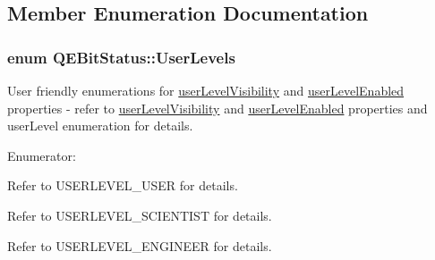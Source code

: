 \subsection{Member Enumeration Documentation}
\hypertarget{classQEBitStatus_a3b7b2b21622eff585577c6ab1b90b5ed}{
\subsubsection[{UserLevels}]{\setlength{\rightskip}{0pt plus 5cm}enum {\bf QEBitStatus::UserLevels}}}
\label{classQEBitStatus_a3b7b2b21622eff585577c6ab1b90b5ed}
User friendly enumerations for \hyperlink{classQEBitStatus_af9179749c38691f33cdcf1f8de7d3e3d}{userLevelVisibility} and \hyperlink{classQEBitStatus_aaf35e62560528034f4d2dd67256c5fba}{userLevelEnabled} properties -\/ refer to \hyperlink{classQEBitStatus_af9179749c38691f33cdcf1f8de7d3e3d}{userLevelVisibility} and \hyperlink{classQEBitStatus_aaf35e62560528034f4d2dd67256c5fba}{userLevelEnabled} properties and userLevel enumeration for details. \begin{Desc}
\item[Enumerator: ]\par
\begin{description}
\item[{\em 
\hypertarget{classQEBitStatus_a3b7b2b21622eff585577c6ab1b90b5edac90ba0a8e50d171ace05c3e658b22c5f}{
User}
\label{classQEBitStatus_a3b7b2b21622eff585577c6ab1b90b5edac90ba0a8e50d171ace05c3e658b22c5f}
}]Refer to USERLEVEL\_\-USER for details. \item[{\em 
\hypertarget{classQEBitStatus_a3b7b2b21622eff585577c6ab1b90b5eda9551f9fd57b4a79a3f0acab100dd54da}{
Scientist}
\label{classQEBitStatus_a3b7b2b21622eff585577c6ab1b90b5eda9551f9fd57b4a79a3f0acab100dd54da}
}]Refer to USERLEVEL\_\-SCIENTIST for details. \item[{\em 
\hypertarget{classQEBitStatus_a3b7b2b21622eff585577c6ab1b90b5edaf8ad93072e055c44cc3ced7198ba000d}{
Engineer}
\label{classQEBitStatus_a3b7b2b21622eff585577c6ab1b90b5edaf8ad93072e055c44cc3ced7198ba000d}
}]Refer to USERLEVEL\_\-ENGINEER for details. \end{description}
\end{Desc}



